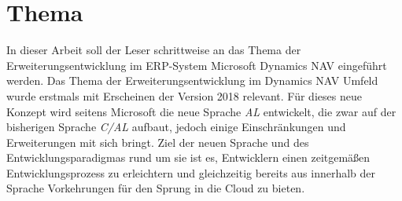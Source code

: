 \chapter{Thema}
\label{cha:Thema}

In dieser Arbeit soll der Leser schrittweise an das Thema der Erweiterungsentwicklung im ERP-System Microsoft Dynamics NAV eingeführt werden. 
Das Thema der Erweiterungsentwicklung im Dynamics NAV Umfeld wurde erstmals mit Erscheinen der Version 2018 relevant. Für dieses neue Konzept wird seitens Microsoft die neue Sprache \emph{AL} entwickelt, die zwar auf der bisherigen Sprache \emph{C/AL} aufbaut, jedoch einige Einschränkungen und Erweiterungen mit sich bringt. Ziel der neuen Sprache und des Entwicklungsparadigmas rund um sie ist es, Entwicklern einen zeitgemäßen Entwicklungsprozess zu erleichtern und gleichzeitig bereits aus innerhalb der Sprache Vorkehrungen für den Sprung in die Cloud zu bieten. 